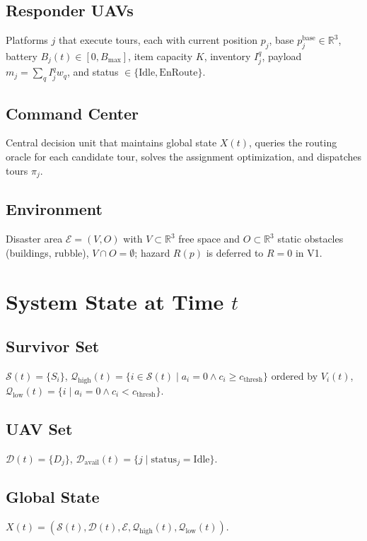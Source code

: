 \documentclass[conference]{IEEEtran}
\begin{document}
\subsection{Responder UAVs}
Platforms $j$ that execute tours, each with current position $p_j$, base $p_j^{\text{base}}\in\mathbb{R}^3$, battery $B_j(t)\in[0,B_{\max}]$, item capacity $K$, inventory $I_j^q$, payload $m_j=\sum_q I_j^q w_q$, and status $\in\{\text{Idle},\text{EnRoute}\}$.

\subsection{Command Center}
Central decision unit that maintains global state $X(t)$, queries the routing oracle for each candidate tour, solves the assignment optimization, and dispatches tours $\pi_j$.

\subsection{Environment}
Disaster area $\mathcal{E}=(V,O)$ with $V\subset\mathbb{R}^3$ free space and $O\subset\mathbb{R}^3$ static obstacles (buildings, rubble), $V\cap O=\emptyset$; hazard $R(p)$ is deferred to $R=0$ in V1.

\section{System State at Time $t$}

\subsection{Survivor Set}
$\mathcal{S}(t)=\{S_i\}$, $\mathcal{Q}_{\text{high}}(t)=\{i\in\mathcal{S}(t)\mid a_i=0\land c_i\ge c_{\text{thresh}}\}$ ordered by $V_i(t)$, $\mathcal{Q}_{\text{low}}(t)=\{i\mid a_i=0\land c_i<c_{\text{thresh}}\}$.

\subsection{UAV Set}
$\mathcal{D}(t)=\{D_j\}$, $\mathcal{D}_{\text{avail}}(t)=\{j\mid \text{status}_j=\text{Idle}\}$.

\subsection{Global State}
$X(t)=(\mathcal{S}(t),\mathcal{D}(t),\mathcal{E},\mathcal{Q}_{\text{high}}(t),\mathcal{Q}_{\text{low}}(t))$.
\end{document}

